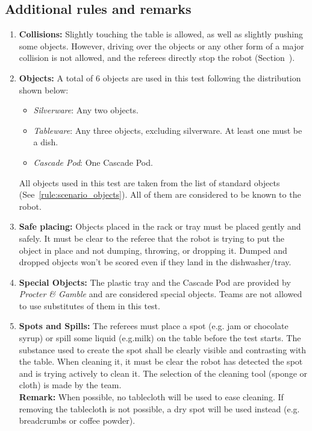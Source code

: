\subsection{Additional rules and remarks}
\begin{enumerate}
	\item \textbf{Collisions:} Slightly touching the table is allowed, as well as slightly pushing some objects. However, driving over the objects or any other form of a major collision is not allowed, and the referees directly stop the robot (Section~).

	\item \textbf{Objects:} A total of 6 objects are used in this test following the distribution shown below:
	\begin{itemize}
		\item\textit{Silverware}: Any two objects.
		\item\textit{Tableware}: Any three objects, excluding silverware. At least one must be a dish.
		\item\textit{Cascade Pod}: One Cascade Pod.
	\end{itemize}
	All objects used in this test are taken from the list of standard objects (See~\ref{rule:scenario_objects}). All of them are considered to be known to the robot.

	\item \textbf{Safe placing:} Objects placed in the rack or tray must be placed gently and safely. It must be clear to the referee that the robot is trying to put the object in place and not dumping, throwing, or dropping it. Dumped and dropped objects won't be scored even if they land in the dishwasher/tray.

	\item \textbf{Special Objects:} The plastic tray and the Cascade Pod are provided by \textit{Procter \& Gamble} and are considered special objects. Teams are not allowed to use substitutes of them in this test.

	\item \textbf{Spots and Spills:} The referees must place a spot (e.g. jam or chocolate syrup) or spill some liquid (e.g.milk) on the table before the test starts. The substance used to create the spot shall be clearly visible and contrasting with the table. When cleaning it, it must be clear the robot has detected the spot and is trying actively to clean it. The selection of the cleaning tool (sponge or cloth) is made by the team.\\
	\textbf{Remark:} When possible, no tablecloth will be used to ease cleaning. If removing the tablecloth is not possible, a dry spot will be used instead (e.g. breadcrumbs or coffee powder).


\end{enumerate}
